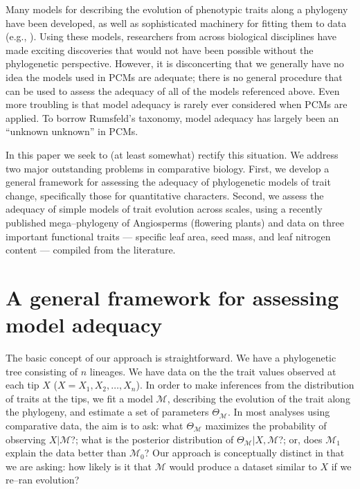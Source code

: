 \documentclass[a4paper,12pt]{article}
\begin{document}
Many models for describing the evolution of phenotypic traits along a phylogeny have been developed, as well as sophisticated machinery for fitting them to data (e.g., \citep{Felsenstein1985, Hansen1997, Pagel1999, Blomberg2003, ButlerKing2004, Omeara2006, Eastman2011, Beaulieu2012, SlaterMEE, UyedaBayou}). Using these models, researchers from across biological disciplines have made exciting discoveries that would not have been possible without the phylogenetic perspective. However, it is disconcerting that we generally have no idea %
the models used in PCMs are adequate; there is no general %
procedure that can be used to assess the adequacy of all of the models referenced above. Even more troubling is that model adequacy is rarely ever considered when PCMs are applied. To borrow Rumsfeld's taxonomy, model adequacy has largely been an ``unknown unknown'' in PCMs.

In this paper we seek to (at least somewhat) rectify this situation. We address two major outstanding problems in comparative biology. First, we develop a general framework for assessing the adequacy of phylogenetic models of trait change, specifically those for quantitative characters. Second, we assess the adequacy of simple models of trait evolution across scales, using a recently published mega--phylogeny of Angiosperms (flowering plants) \citep{Zanne2013} and data on three important functional traits --- specific leaf area, seed mass, and leaf nitrogen content --- compiled from the literature. 

\section{A general framework for assessing model adequacy}
The basic concept of our approach is straightforward. We have a phylogenetic tree consisting of $n$ lineages. We have data on the the trait values observed at each tip $X$ ($X= X_1, X_2, \ldots, X_n$). In order to make inferences from the distribution of traits at the tips, we fit a model $\mathcal{M}$, describing the evolution of the trait along the phylogeny, and estimate a set of parameters $\Theta_{\mathcal{M}}$. In most analyses using comparative data, the aim is to ask: what $\Theta_{\mathcal{M}}$  maximizes the probability of observing $X|\mathcal{M}$?; what is the posterior distribution of $\Theta_{\mathcal{M}}|X, \mathcal{M}$?; or, does $\mathcal{M}_1$ explain the data better than $\mathcal{M}_0$? Our approach is conceptually distinct in that we are asking: how likely is it that $\mathcal{M}$ would produce a dataset similar to $X$ if we re--ran evolution?
\end{document}
